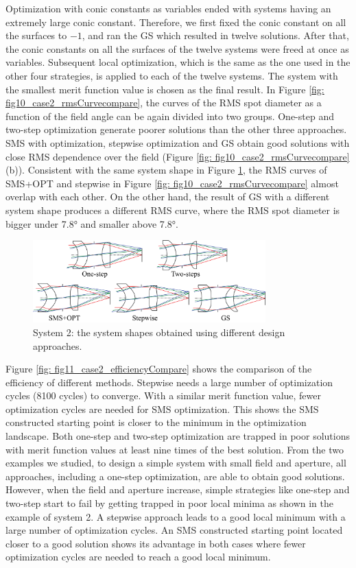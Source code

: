 Optimization with conic constants as variables ended with systems having an extremely large conic constant. Therefore, we first fixed the conic constant on all the surfaces to $-1$, and ran the GS which resulted in twelve solutions. After that, the conic constants on all the surfaces of the twelve systems were freed at once as variables. Subsequent local optimization, which is the same as the one used in the other four strategies, is applied to each of the twelve systems. The system with the smallest merit function value is chosen as the final result. In Figure \ref{fig: fig10_case2_rmsCurvecompare}, the curves of the RMS spot diameter as a function of the field angle can be again divided into two groups. One-step and two-step optimization generate poorer solutions than the other three approaches. SMS with optimization, stepwise optimization and GS obtain good solutions with close RMS dependence over the field (Figure \ref{fig: fig10_case2_rmsCurvecompare}(b)). Consistent with the same system shape in Figure \ref{fig: fig9_case2_systems}, the RMS curves of SMS+OPT and stepwise in Figure \ref{fig: fig10_case2_rmsCurvecompare} almost overlap with each other. On the other hand, the result of GS with a different system shape produces a different RMS curve, where the RMS spot diameter is bigger under 7.8° and smaller above 7.8°.

\begin{figure}[h!]
    \centering
    \includegraphics[width=0.8\textwidth]{chapter-5/figures/Figure9_system2_solutions.png}
    \caption{System 2: the system shapes obtained using different design approaches.}
    \label{fig: fig9_case2_systems}
\end{figure}

Figure \ref{fig: fig11_case2_efficiencyCompare} shows the comparison of the efficiency of different methods. Stepwise needs a large number of optimization cycles (8100 cycles) to converge. With a similar merit function value, fewer optimization cycles are needed for SMS optimization. This shows the SMS constructed starting point is closer to the minimum in the optimization landscape. Both one-step and two-step optimization are trapped in poor solutions with merit function values at least nine times of the best solution. 
From the two examples we studied, to design a simple system with small field and aperture, all approaches, including a one-step optimization, are able to obtain good solutions. However, when the field and aperture increase, simple strategies like one-step and two-step start to fail by getting trapped in poor local minima as shown in the example of system 2. A stepwise approach leads to a good local minimum with a large number of optimization cycles. An SMS constructed starting point located closer to a good solution shows its advantage in both cases where fewer optimization cycles are needed to reach a good local minimum.

